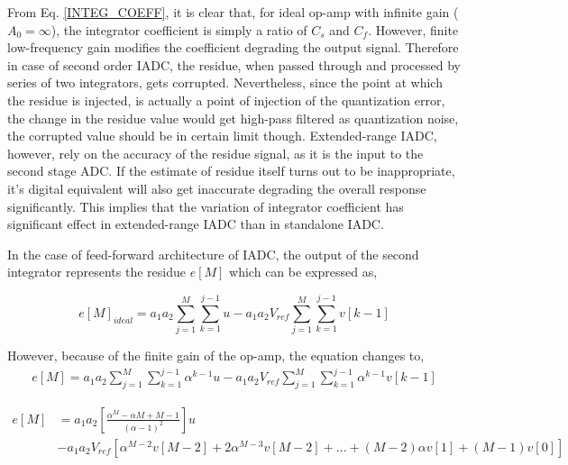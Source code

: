 From Eq. \ref{INTEG_COEFF}, it is clear that, for ideal op-amp with infinite gain ($A_0=\infty$), the integrator coefficient is simply a ratio of $C_s$ and $C_f$. However, finite low-frequency gain modifies the coefficient degrading the output signal. Therefore in case of second order IADC, the residue, when passed through and processed by series of two integrators, gets corrupted. Nevertheless, since the point at which the residue is injected, is actually a point of injection of the quantization error, the change in the residue value would get high-pass filtered as quantization noise, the corrupted value should be in certain limit though. Extended-range IADC, however, rely on the accuracy of the residue signal, as it is the input to the second stage ADC. If the estimate of residue itself turns out to be inappropriate, it's digital equivalent will also get inaccurate degrading the overall response significantly. This implies that the variation of integrator coefficient has significant effect in extended-range IADC than in standalone IADC.

In the case of feed-forward architecture of IADC, the output of the second integrator represents the residue $e[M]$ which can be expressed as,

\begin{equation}\label{RESIDUE_IDEAL}
    e[M]_{ideal} = a_1a_2\sum_{j=1}^{M}\sum_{k=1}^{j-1}u-a_1a_2V_{ref}\sum_{j=1}^{M}\sum_{k=1}^{j-1} v[k-1]
\end{equation}
 
 However, because of the finite gain of the op-amp, the equation changes to,
 \begin{equation*}
     \begin{split}
         e[M] = a_1a_2\sum_{j=1}^{M}\sum_{k=1}^{j-1}\alpha^{k-1}u-a_1a_2V_{ref}\sum_{j=1}^{M}\sum_{k=1}^{j-1} \alpha^{k-1}v[k-1]
     \end{split}
 \end{equation*}
 
  \begin{equation}\label{Vout_erisdm}
\begin{split}
     e[M]&=a_1a_2\left[\frac{\alpha^M-\alpha M+M-1}{\left(\alpha-1\right)^2}\right]u\\
         &-a_1a_2V_{ref}\left[\alpha^{M-2}v[M-2]+2\alpha^{M-3}v[M-2]+...+(M-2)\alpha v[1]+(M-1)v[0]\right]
\end{split}
\end{equation}

